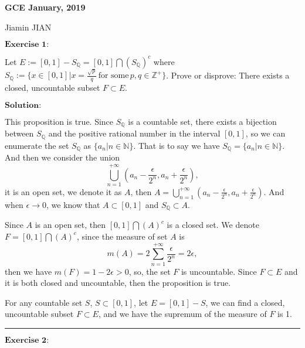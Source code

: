 \documentclass[12pt,a4paper]{ctexart}
\begin{document}
\begin{center}
\textbf{ GCE January, 2019}
\vspace{8pt}

Jiamin JIAN
\end{center}

\vspace{12pt}

$\textbf{Exercise 1:}$

Let $E:= [0, 1] - S_{\mathbb{Q}} = [0, 1] \bigcap (S_{\mathbb{Q}})^{c}$ where $S_{\mathbb{Q}} := \{x \in [0, 1] | x = \frac{\sqrt{p}}{q}   \,  \text{for some} \, p, q \in \mathbb{Z}^{+} \}$. Prove or disprove: There exists a closed, uncountable subset $F \subset E$.

\vspace{8pt}

$\textbf{Solution:}$

This proposition is true. Since $S_{\mathbb{Q}}$ is a countable set, there exists a bijection between $S_{\mathbb{Q}}$ and the positive rational number in the interval $[0, 1]$, so we can enumerate the set $S_{\mathbb{Q}}$ as $\{a_{n} | n \in \mathbb{N} \}$. That is to say we have $S_{\mathbb{Q}} = \{a_{n} | n \in \mathbb{N} \}$. And then we consider the union 
$$\bigcup_{n = 1}^{+ \infty}(a_{n} - \frac{\epsilon}{2^{n}}, a_{n} + \frac{\epsilon}{2^{n}}),$$
it is an open set, we denote it as $A$, then $A = \bigcup_{n = 1}^{+ \infty}(a_{n} - \frac{\epsilon}{2^{n}}, a_{n} + \frac{\epsilon}{2^{n}})$. And when $\epsilon \to 0$, we know that $A \subset [0, 1]$ and $S_{\mathbb{Q}} \subset A$.

Since $A$ is an open set, then $[0, 1] \bigcap (A)^{c}$ is a closed set. We denote $F = [0, 1] \bigcap (A)^{c}$, since the measure of set $A$ is
\begin{equation*}
    m(A) = 2 \sum_{n = 1}^{+ \infty}  \frac{\epsilon}{2^{n}} = 2 \epsilon,
\end{equation*}
then we have $m(F) = 1 - 2 \epsilon > 0$, so, the set $F$ is uncountable. Since $F \subset E$ and it is both closed and uncountable, then the proposition is true.

For any countable set $S$, $S \subset [0, 1]$, let $E = [0, 1] - S$, we can find a closed, uncountable subset $F \subset E$, and we have the supremum of the measure of $F$ is 1.

\noindent\rule[0.25\baselineskip]{\textwidth}{0.5pt}

\vspace{8pt}
$\textbf{Exercise 2:}$
\end{document}
